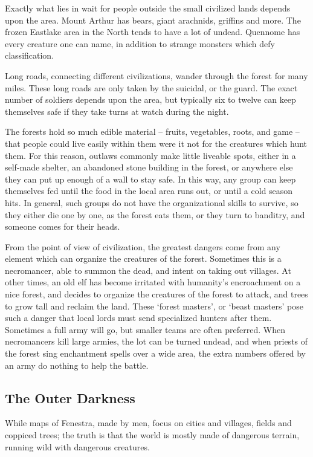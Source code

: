 \begin{multicols}{2}
Exactly what lies in wait for people outside the small civilized lands depends upon the area.
Mount Arthur has bears, giant arachnids, griffins and more.
The frozen Eastlake area in the North tends to have a lot of undead.
Quennome has every creature one can name, in addition to strange monsters which defy classification.

Long roads, connecting different civilizations, wander through the forest for many miles.
These long roads are only taken by the suicidal, or the \gls{guard}.
The exact number of soldiers depends upon the area, but typically six to twelve can keep themselves safe if they take turns at watch during the night.

The forests hold so much edible material -- fruits, vegetables, roots, and game -- that people could live easily within them were it not for the creatures which hunt them.
For this reason, outlaws commonly make little liveable spots, either in a self-made shelter, an abandoned stone building in the forest, or anywhere else they can put up enough of a wall to stay safe.
In this way, any group can keep themselves fed until the food in the local area runs out, or until a cold season hits.
In general, such groups do not have the organizational skills to survive, so they either die one by one, as the forest eats them, or they turn to banditry, and someone comes for their heads.

From the point of view of civilization, the greatest dangers come from any element which can organize the creatures of the forest.
Sometimes this is a necromancer, able to summon the dead, and intent on taking out villages.
At other times, an old elf has become irritated with humanity's encroachment on a nice forest, and decides to organize the creatures of the forest to attack, and trees to grow tall and reclaim the land.
These `forest masters', or `beast masters' pose such a danger that local lords must send specialized hunters after them.
Sometimes a full army will go, but smaller teams are often preferred.
When necromancers kill large armies, the lot can be turned undead, and when priests of the forest sing enchantment spells over a wide area, the extra numbers offered by an army do nothing to help the battle.

\subsection{The Outer Darkness}

While maps of Fenestra, made by men, focus on cities and villages, fields and coppiced trees; the truth is that the world is mostly made of dangerous terrain, running wild with dangerous creatures.


\end{multicols}
